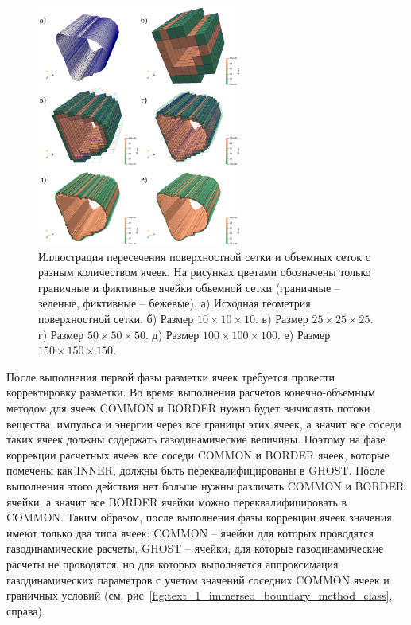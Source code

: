 \begin{figure}[ht]
\centering
\includegraphics[width=0.6\textwidth]{fig/int_contour.png}
\singlespacing
{}\caption{Иллюстрация пересечения поверхностной сетки и объемных сеток с разным количеством ячеек. На рисунках цветами обозначены только граничные и фиктивные ячейки объемной сетки (граничные -- зеленые, фиктивные -- бежевые). а) Исходная геометрия поверхностной сетки. б) Размер $10 \times 10 \times 10$. в) Размер $25 \times 25 \times 25$. г) Размер $50 \times 50 \times 50$. д) Размер $100 \times 100 \times 100$. е) Размер $150 \times 150 \times 150$.}
\label{fig:text_1_mesh_intersect_contour}
\end{figure}

После выполнения первой фазы разметки ячеек требуется провести корректировку разметки.
Во время выполнения расчетов конечно-объемным методом для ячеек COMMON и BORDER нужно будет вычислять потоки вещества, импульса и энергии через все границы этих ячеек, а значит все соседи таких ячеек должны содержать газодинамические величины.
Поэтому на фазе коррекции расчетных ячеек все соседи COMMON и BORDER ячеек, которые помечены как INNER, должны быть переквалифицированы в GHOST.
После выполнения этого действия нет больше нужны различать COMMON и BORDER ячейки, а значит все BORDER ячейки можно переквалифицировать в COMMON.
Таким образом, после выполнения фазы коррекции ячеек значения имеют только два типа ячеек: COMMON -- ячейки для которых проводятся газодинамические расчеты, GHOST -- ячейки, для которые газодинамические расчеты не проводятся, но для которых выполняется аппроксимация газодинамических параметров с учетом значений соседних COMMON ячеек и граничных условий (см. рис~\ref{fig:text_1_immersed_boundary_method_class}, справа).

